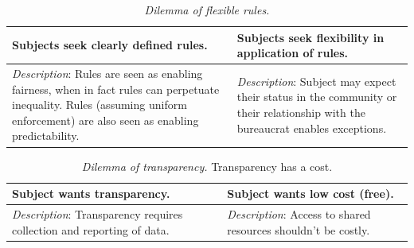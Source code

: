 

\begin{center}
\begin{table}[H] %
\begin{tabular}{ | m{\dilemmatablewidth}| m{\dilemmatablewidth} | } 
  \hline
  \textbf{Subjects seek clearly defined rules.} &
  \textbf{Subjects seek flexibility in application of rules.} \\
  \hline
  \textit{Description}: Rules are seen as enabling fairness, when in fact rules can perpetuate inequality. Rules (assuming uniform enforcement) are also seen as enabling predictability. & 
  \textit{Description}: Subject may expect their status in the community or their relationship with the bureaucrat enables exceptions. \\
  \hline
\end{tabular}
\caption{\textit{Dilemma of flexible rules.}
}
\label{table:dilemma-flexiblity}
\end{table}
\end{center}



\begin{center}
\begin{table}[H] %
\begin{tabular}{ | m{\dilemmatablewidth}| m{\dilemmatablewidth} | } 
  \hline
  \textbf{Subject wants transparency.} &
  \textbf{Subject wants low cost (free).} \\
  \hline
  \textit{Description}: Transparency requires collection and reporting of data. & 
  \textit{Description}: Access to shared resources shouldn't be costly. \\
  \hline
\end{tabular}
\caption{\textit{Dilemma of transparency.}
Transparency has a cost.
}
\label{table:dilemma-transparency}
\end{table}
\end{center}

